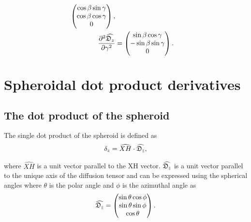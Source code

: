 \begin{subequations}
\begin{align}
\begin{pmatrix}
        \cos \beta \sin \gamma \\
        \cos \beta \cos \gamma \\
        0 \\
    \end{pmatrix}, \\
    \frac{\partial^2 \widehat{\mathfrak{D}_z}}{\partial \gamma^2} &= \begin{pmatrix}
        \sin \beta \cos \gamma \\
        -\sin \beta \sin \gamma \\
        0 \\
    \end{pmatrix}.
\end{align}
\end{subequations}





\newpage
\section{Spheroidal dot product derivatives}




\subsection{The dot product of the spheroid}

The single dot product of the spheroid is defined as
\begin{equation}
    \delta_z = \widehat{XH} \cdot \widehat{\mathfrak{D}_{\scriptscriptstyle \parallel}},
\end{equation}

\noindent where $\widehat{XH}$ is a unit vector parallel to the XH vector.  $\widehat{\mathfrak{D}_{\scriptscriptstyle \parallel}}$ is a unit vector parallel to the unique axis of the diffusion tensor and can be expressed using the spherical angles where $\theta$ is the polar angle and $\phi$ is the azimuthal angle as
\begin{equation}
    \widehat{\mathfrak{D}_{\scriptscriptstyle \parallel}} = \begin{pmatrix}
        \sin \theta \cos \phi \\
        \sin \theta \sin \phi \\
        \cos \theta \\
    \end{pmatrix}.
\end{equation}



